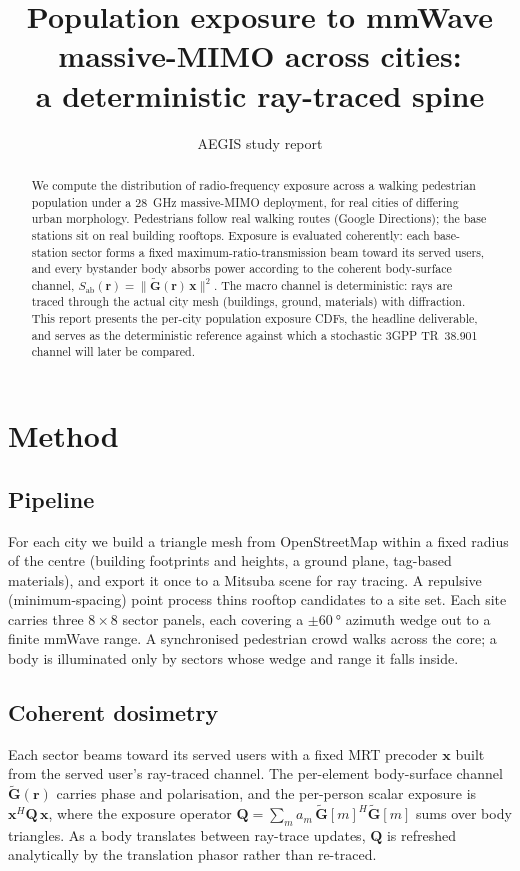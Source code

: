 \documentclass[10pt,journal]{IEEEtran}
\title{Population exposure to mmWave massive-MIMO across cities:\\
a deterministic ray-traced spine}
\author{AEGIS study report}
\begin{document}
\maketitle

\begin{abstract}
We compute the distribution of radio-frequency exposure across a walking
pedestrian population under a \SI{28}{\giga\hertz} massive-MIMO deployment, for
real cities of differing urban morphology. Pedestrians follow real walking
routes (Google Directions); the base stations sit on real building rooftops.
Exposure is evaluated coherently:
each base-station sector forms a fixed maximum-ratio-transmission beam toward its
served users, and every bystander body absorbs power according to the coherent
body-surface channel, $S_\mathrm{ab}(\mathbf r) = \lVert \tilde{\mathbf
G}(\mathbf r)\,\mathbf x \rVert^2$. The macro channel is deterministic: rays are
traced through the actual city mesh (buildings, ground, materials) with
diffraction. This report presents the per-city population exposure CDFs, the
headline deliverable, and serves as the deterministic reference against which a
stochastic 3GPP TR~38.901 channel will later be compared.
\end{abstract}

\section{Method}

\subsection{Pipeline}
For each city we build a triangle mesh from OpenStreetMap within a fixed radius
of the centre (building footprints and heights, a ground plane, tag-based
materials), and export it once to a Mitsuba scene for ray tracing. A repulsive
(minimum-spacing) point process thins rooftop candidates to a site set. Each site
carries three \(8\times8\) sector panels, each covering a \(\pm\SI{60}{\degree}\)
azimuth wedge out to a finite mmWave range. A synchronised pedestrian crowd walks
across the core; a body is illuminated only by sectors whose wedge and range it
falls inside.

\subsection{Coherent dosimetry}
Each sector beams toward its served users with a fixed MRT precoder \(\mathbf x\)
built from the served user's ray-traced channel. The per-element body-surface
channel \(\tilde{\mathbf G}(\mathbf r)\) carries phase and polarisation, and the
per-person scalar exposure is \(\mathbf x^{H} \mathbf Q\, \mathbf x\), where the
exposure operator \(\mathbf Q = \sum_m a_m\, \tilde{\mathbf G}[m]^{H}
\tilde{\mathbf G}[m]\) sums over body triangles. As a body translates between
ray-trace updates, \(\mathbf Q\) is refreshed analytically by the translation
phasor rather than re-traced.
\end{document}
